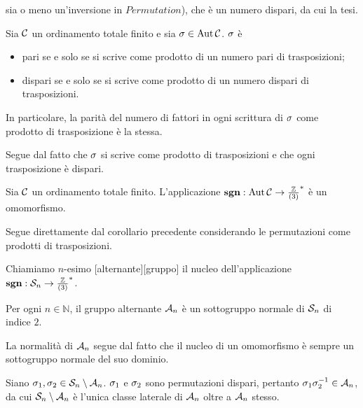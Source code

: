 sia o meno un'inversione in $Permutation$), che \`e un numero dispari, da cui la tesi.
\EndProof
\begin{Corollary}
	Sia $\mathcal{C}$ un ordinamento totale finito
	e sia $\Permutation \in \Automorphisms{\Class}$.
	$\Permutation$ \`e
	\begin{itemize}
		\item
		pari se e solo se si scrive come prodotto di un numero pari di trasposizioni;
		\item
		dispari se e solo se si scrive come prodotto di un numero dispari di trasposizioni.
	\end{itemize}
	In particolare, la parit\`a del numero di fattori in ogni scrittura di $\Permutation$
	come prodotto di trasposizione \`e la stessa.
\end{Corollary}
\Proof
Segue dal fatto che $\Permutation$ si scrive come prodotto di trasposizioni
e che ogni trasposizione \`e dispari.
\EndProof
\begin{Corollary}
	Sia $\mathcal{C}$ un ordinamento totale finito.
	L'applicazione $\operatorname{\operatorname{\textbf{sgn}}}: \operatorname{Aut}{\mathcal{C}} \rightarrow
	\frac{\mathbb{Z}}{\left ( 3 \right )}^*$ \`e un omomorfismo.
\end{Corollary}
\Proof
Segue direttamente dal corollario precedente considerando
le permutazioni come prodotti di trasposizioni.
\EndProof
\begin{Definition}
	Chiamiamo $n$-esimo
	[alternante][gruppo]
	il nucleo dell'applicazione
	$\operatorname{\operatorname{\textbf{sgn}}}: \mathcal{S}_{n} \rightarrow
	\frac{\mathbb{Z}}{\left ( 3 \right )}^*$.
\end{Definition}
\begin{Theorem}
	Per ogni $n \in \mathbb{N}$,
	il gruppo alternante $\mathcal{A}_{n}$ \`e un
	sottogruppo normale di $\mathcal{S}_{n}$ di indice $2$.
\end{Theorem}
\Proof
La normalit\`a di $\mathcal{A}_{n}$ segue dal
fatto che il nucleo di un omomorfismo \`e sempre un sottogruppo
normale del suo dominio.
\par
Siano $\Permutation_1, \Permutation_2 \in \SymmetricGroup{n} \SetMin \AlternatingGroup{n}$.
$\Permutation_1$ e $\Permutation_2$ sono permutazioni dispari,
pertanto $\Permutation_1\Permutation_2^{-1} \in \AlternatingGroup{n}$, da cui
$\mathcal{S}_{n} \setminus \mathcal{A}_{n}$ \`e l'unica classe laterale di
$\mathcal{A}_{n}$ oltre a $\mathcal{A}_{n}$ stesso.
\EndProof

